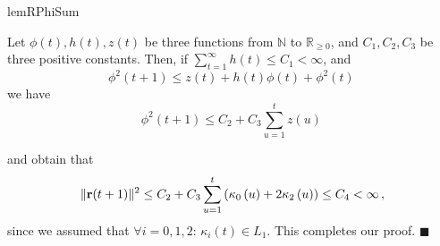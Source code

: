 \documentclass[twoside,11pt,english]{article}
\begin{document}
\begin{restatable}{lemR}{PhiSum}

\label{lem: PhiSum}Let $\phi\left(t\right),h\left(t\right),z\left(t\right)$
be three functions from $\mathbb{N}$ to $\mathbb{R}_{\geq0}$, and
$C_{1},C_{2},C_{3}$ be three positive constants. Then, if $\sum_{t=1}^{\infty}h\left(t\right)\leq C_{1}<\infty$,
and 
\begin{equation}
\phi^{2}\left(t+1\right)\leq z\left(t\right)+h\left(t\right)\phi\left(t\right)+\phi^{2}\left(t\right)\,\label{eq: rho bound}
\end{equation}
we have
\begin{equation}
\phi^{2}\left(t+1\right)\leq C_{2}+C_{3}\sum_{u=1}^{t}z\left(u\right)\,\label{eq: rho sum bound}
\end{equation}

\end{restatable}
and obtain that 
\[
\Vert\mathbf{r}(t+1)\Vert^{2}\leq C_{2}+C_{3}\sum_{u=1}^{t}\left(\kappa_{0}\left(u\right)+2\kappa_{2}\left(u\right)\right)\leq C_{4}<\infty\,,
\]
since we assumed that $\forall i=0,1,2:\,\kappa_{i}\left(t\right)\in L_{1}$.
This completes our proof. $\blacksquare$
\end{document}
